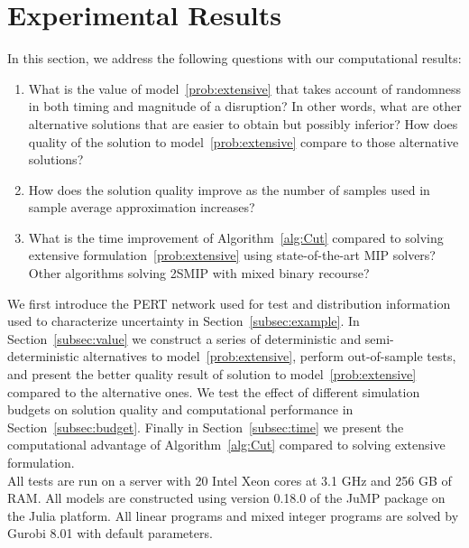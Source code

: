 \documentclass[11pt]{article}
\begin{document}
\section{Experimental Results} \label{sec:results}
	In this section, we address the following questions with our computational results:
	\begin{enumerate}
		\item What is the value of model~\eqref{prob:extensive} that takes account of randomness in both timing and magnitude of a disruption? In other words, what are other alternative solutions that are easier to obtain but possibly inferior? How does quality of the solution to model~\eqref{prob:extensive} compare to those alternative solutions?
		\item How does the solution quality improve as the number of samples used in sample average approximation increases? 
		\item What is the time improvement of Algorithm~\ref{alg:Cut} compared to solving extensive formulation~\eqref{prob:extensive} using state-of-the-art MIP solvers? Other algorithms solving 2SMIP with mixed binary recourse?
	\end{enumerate}
	We first introduce the PERT network used for test and distribution information used to characterize uncertainty in Section~\ref{subsec:example}. In Section~\ref{subsec:value} we construct a series of deterministic and semi-deterministic alternatives to model~\eqref{prob:extensive}, perform out-of-sample tests, and present the better quality result of solution to model~\eqref{prob:extensive} compared to the alternative ones. We test the effect of different simulation budgets on solution quality and computational performance in Section~\ref{subsec:budget}. Finally in Section~\ref{subsec:time} we present the computational advantage of Algorithm~\ref{alg:Cut} compared to solving extensive formulation.\\
	\newline
	All tests are run on a server with 20 Intel Xeon cores at 3.1 GHz and 256 GB of RAM. All models are constructed using version 0.18.0 of the JuMP package \cite{DunningHuchetteLubin2017} on the Julia platform. All linear programs and mixed integer programs are solved by Gurobi 8.01 \cite{gurobi2016} with default parameters.
	
\end{document}

